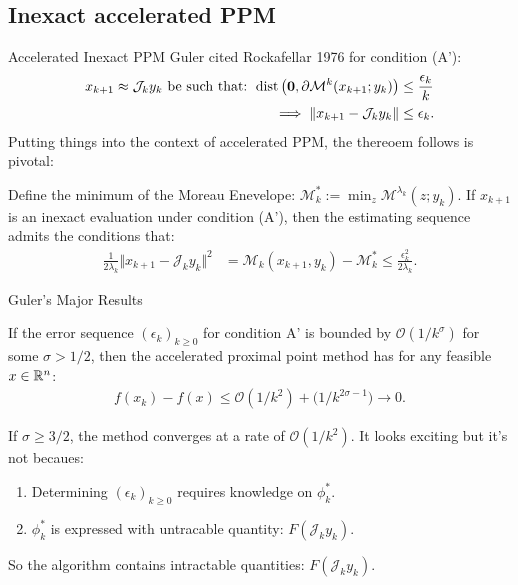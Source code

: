 \documentclass[11pt]{beamer}
\begin{document}
    \subsection{Inexact accelerated PPM}
        \begin{frame}{Accelerated Inexact PPM}
            Guler cited Rockafellar 1976 \cite{rockafellar_monotone_1976} for condition (A'): 
            \begin{align*}
                x_{k + 1}\approx \mathcal J_{k} y_k \text{ be such that: }
                \operatorname{dist}\left(
                    \mathbf 0, \partial \mathcal M^{k}(x_{k + 1}; y_k)
                \right) &\le \frac{\epsilon_k}{k}
                \\
                \implies 
                \Vert x_{k + 1} - \mathcal J_{k}y_k\Vert 
                &\le \epsilon_k. 
            \end{align*}
            Putting things into the context of accelerated PPM, the thereoem follows is pivotal: 
            \begin{theorem}
                Define the minimum of the Moreau Enevelope: $\mathcal M_k^* := \min_z \mathcal {M}^{\lambda_k}(z; y_k)$. 
                If $x_{k +1}$ is an inexact evaluation under condition (A'), then the estimating sequence admits the conditions that: 
                \begin{align*}
                    \frac{1}{2\lambda_k} \Vert x_{k + 1} - \mathcal J_k y_k\Vert^2
                    &= 
                    \mathcal M_k(x_{k + 1}, y_k) - \mathcal M^*_k
                    \le \frac{\epsilon_k^2}{2\lambda_k}. 
                \end{align*}
            \end{theorem}
        \end{frame}
        \begin{frame}{Guler's Major Results}
            \begin{theorem}
                If the error sequence $(\epsilon_k)_{k \ge0}$ for condition A' is bounded by $\mathcal O(1/k^\sigma)$ for some $\sigma > 1/2$, then the accelerated proximal point method has for any feasible $x \in \mathbb R^n$: 
                \begin{align*}
                    f(x_k) - f(x) \le \mathcal O(1/k^2) + \mathcal (1 / k^{2\sigma - 1}) \rightarrow 0. 
                \end{align*}    
            \end{theorem}
            If $\sigma \ge 3/2$, the method converges at a rate of $\mathcal O(1/k^2)$. 
            \pause 
            It looks exciting but it's not becaues: 
            \begin{enumerate}
                \item Determining $(\epsilon_k)_{k\ge 0}$ requires knowledge on $\phi_k^*$. 
                \item $\phi_k^*$ is expressed with untracable quantity: $F(\mathcal J_k y_k)$. 
            \end{enumerate}
            So the algorithm contains intractable quantities: $F(\mathcal J_k y_k)$. 
        \end{frame}
\end{document}
